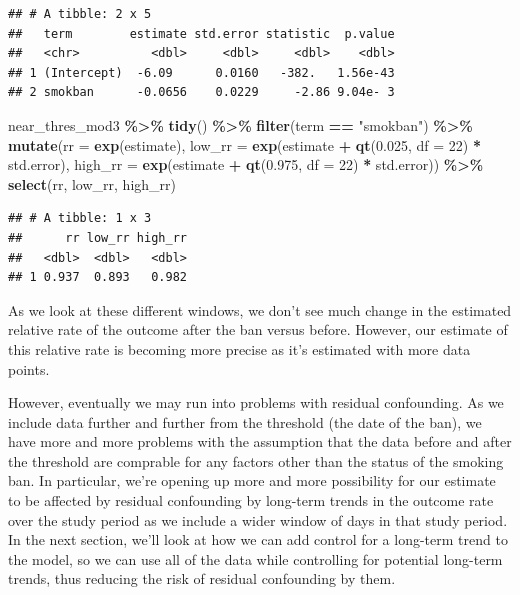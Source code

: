 \documentclass[
]{book}
\newenvironment{Shaded}{\begin{snugshade}}{\end{snugshade}}
\newcommand{\AttributeTok}[1]{\textcolor[rgb]{0.13,0.29,0.53}{#1}}
\newcommand{\DecValTok}[1]{\textcolor[rgb]{0.00,0.00,0.81}{#1}}
\newcommand{\FloatTok}[1]{\textcolor[rgb]{0.00,0.00,0.81}{#1}}
\newcommand{\FunctionTok}[1]{\textcolor[rgb]{0.13,0.29,0.53}{\textbf{#1}}}
\newcommand{\NormalTok}[1]{#1}
\newcommand{\SpecialCharTok}[1]{\textcolor[rgb]{0.81,0.36,0.00}{\textbf{#1}}}
\newcommand{\StringTok}[1]{\textcolor[rgb]{0.31,0.60,0.02}{#1}}
\begin{document}
\begin{verbatim}
## # A tibble: 2 x 5
##   term        estimate std.error statistic  p.value
##   <chr>          <dbl>     <dbl>     <dbl>    <dbl>
## 1 (Intercept)  -6.09      0.0160   -382.   1.56e-43
## 2 smokban      -0.0656    0.0229     -2.86 9.04e- 3
\end{verbatim}

\begin{Shaded}
\begin{Highlighting}[]
\NormalTok{near\_thres\_mod3 }\SpecialCharTok{\%\textgreater{}\%} 
  \FunctionTok{tidy}\NormalTok{() }\SpecialCharTok{\%\textgreater{}\%} 
  \FunctionTok{filter}\NormalTok{(term }\SpecialCharTok{==} \StringTok{"smokban"}\NormalTok{) }\SpecialCharTok{\%\textgreater{}\%} 
  \FunctionTok{mutate}\NormalTok{(}\AttributeTok{rr =} \FunctionTok{exp}\NormalTok{(estimate), }
         \AttributeTok{low\_rr =} \FunctionTok{exp}\NormalTok{(estimate }\SpecialCharTok{+} \FunctionTok{qt}\NormalTok{(}\FloatTok{0.025}\NormalTok{, }\AttributeTok{df =} \DecValTok{22}\NormalTok{) }\SpecialCharTok{*}\NormalTok{ std.error), }
         \AttributeTok{high\_rr =} \FunctionTok{exp}\NormalTok{(estimate }\SpecialCharTok{+} \FunctionTok{qt}\NormalTok{(}\FloatTok{0.975}\NormalTok{, }\AttributeTok{df =} \DecValTok{22}\NormalTok{) }\SpecialCharTok{*}\NormalTok{ std.error)) }\SpecialCharTok{\%\textgreater{}\%} 
  \FunctionTok{select}\NormalTok{(rr, low\_rr, high\_rr)}
\end{Highlighting}
\end{Shaded}

\begin{verbatim}
## # A tibble: 1 x 3
##      rr low_rr high_rr
##   <dbl>  <dbl>   <dbl>
## 1 0.937  0.893   0.982
\end{verbatim}

As we look at these different windows, we don't see much change in the estimated relative rate of the outcome after the ban versus before. However, our estimate of this relative rate is becoming more precise as it's estimated with more data points.

However, eventually we may run into problems with residual confounding. As we include data further and further from the threshold (the date of the ban), we have more and more problems with the assumption that the data before and after the threshold are comprable for any factors other than the status of the smoking ban. In particular, we're opening up more and more possibility for our estimate to be affected by residual confounding by long-term trends in the outcome rate over the study period as we include a wider window of days in that study period. In the next section, we'll look at how we can add control for a long-term trend to the model, so we can use all of the data while controlling for potential long-term trends, thus reducing the risk of residual confounding by them.
\end{document}
